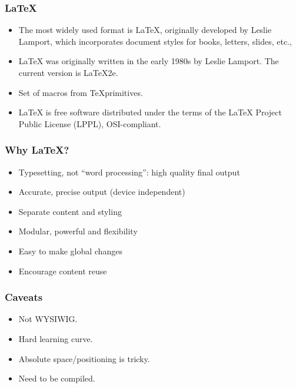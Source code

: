 \documentclass{beamer}
\begin{document}
\begin{frame}
\frametitle{\LaTeX}

\begin{itemize}

\item The most widely used \alert{format} is \LaTeX, originally developed by Leslie Lamport, which incorporates document styles for books, letters, slides, etc., 
\item \LaTeX{} was originally written in the early 1980s by Leslie Lamport. The current version is \LaTeX2e.
\item Set of macros from \TeX primitives.  
\item \LaTeX{} is free software distributed under the terms of the LaTeX Project Public License (LPPL), OSI-compliant.

\end{itemize}

\end{frame}


\begin{frame}
\frametitle{Why \LaTeX?}

\begin{itemize}

\item Typesetting, not ``word processing'': high quality final output
\item Accurate, precise output (device independent)
\item Separate content and styling
\item Modular, powerful and flexibility
\item Easy to make global changes
\item Encourage content reuse

\end{itemize}

\end{frame}


\begin{frame}
\frametitle{Caveats}

\begin{itemize}

\item Not WYSIWIG.
\item Hard learning curve.
\item Absolute space/positioning is tricky.
\item Need to be compiled.

\end{itemize}

\end{frame}
\end{document}
